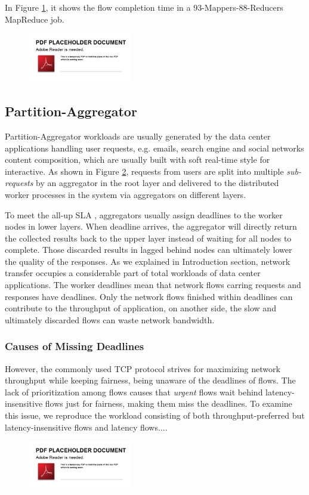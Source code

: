 In Figure \ref{fig:shuffle_long_tail}, it shows the flow completion time in a 93-Mappers-88-Reducers MapReduce job. 

\begin{figure}
  \centering
  \includegraphics[width=0.4\textwidth]{pic/placeholder}\\
  \caption{}
  \label{fig:shuffle_long_tail}
\end{figure}

\subsection{Partition-Aggregator}

Partition-Aggregator \cite{DCTCP} workloads are usually generated by the data center applications handling user requests, e.g. emails, search engine and social networks content composition, which are usually built with soft real-time style for interactive. As shown in Figure \ref{fig:par-agg}, requests from users are split into multiple \emph{sub-requests} by an aggregator in the root layer and delivered to the distributed worker processes in the system via aggregators on different layers. 

To meet the all-up SLA \cite{DCTCP}, aggregators usually assign deadlines to the worker nodes in lower layers. When deadline arrives, the aggregator will directly return the collected results back to the upper layer instead of waiting for all nodes to complete. Those discarded results in lagged behind nodes can ultimately lower the quality of the responses. As we explained in Introduction section, network transfer occupies a considerable part of total workloads of data center applications. The worker deadlines mean that network flows carring requests and responses have deadlines. Only the network flows finished within deadlines can contribute to the throughput of application, on another side, the slow and ultimately discarded flows can waste network bandwidth.

\subsubsection{Causes of Missing Deadlines}

However, the commonly used TCP protocol strives for maximizing network throughput while keeping fairness, being unaware of the deadlines of flows. The lack of prioritization among flows causes that \emph{urgent} flows wait behind latency-insensitive flows just for fairness, making them miss the deadlines. To examine this issue, we reproduce the workload consisting of both throughput-preferred but latency-insensitive flows and latency flows....


\begin{figure}
  \centering
  \includegraphics[width=0.4\textwidth]{pic/placeholder}\\
  \caption{}
  \label{fig:par-agg}
\end{figure}

